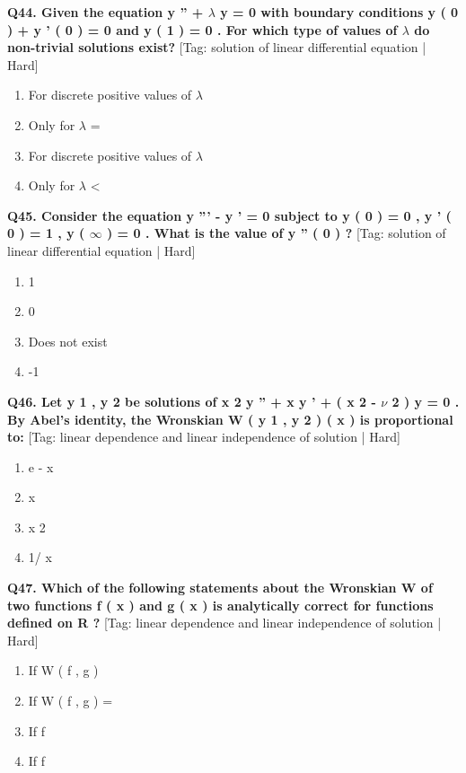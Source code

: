 \noindent\textbf{Q44. Given the equation y '' + $\lambda$ y = 0 with boundary conditions y ( 0 ) + y ' ( 0 ) = 0 and y ( 1 ) = 0 . For which type of values of $\lambda$ do non-trivial solutions exist?} \hfill [Tag: solution of linear differential equation | Hard]
\begin{enumerate}[label=(\alph*),topsep=2pt,itemsep=1pt,partopsep=0pt,parsep=0pt]
    \item {{For discrete positive values of $\lambda$}}
    \item {{Only for $\lambda$ =}}
    \item {{For discrete positive values of $\lambda$}}
    \item {{Only for $\lambda$ <}}
\end{enumerate}
\vspace{2mm}

\noindent\textbf{Q45. Consider the equation y ''' - y ' = 0 subject to y ( 0 ) = 0 , y ' ( 0 ) = 1 , y ( $\infty$ ) = 0 . What is the value of y '' ( 0 ) ?} \hfill [Tag: solution of linear differential equation | Hard]
\begin{enumerate}[label=(\alph*),topsep=2pt,itemsep=1pt,partopsep=0pt,parsep=0pt]
    \item {{1}}
    \item {{0}}
    \item {{Does not exist}}
    \item {{-1}}
\end{enumerate}
\vspace{2mm}

\noindent\textbf{Q46. Let y 1 , y 2 be solutions of x 2 y '' + x y ' + ( x 2 - $\nu$ 2 ) y = 0 . By Abel's identity, the Wronskian W ( y 1 , y 2 ) ( x ) is proportional to:} \hfill [Tag: linear dependence and linear independence of solution | Hard]
\begin{enumerate}[label=(\alph*),topsep=2pt,itemsep=1pt,partopsep=0pt,parsep=0pt]
    \item {{e - x}}
    \item {{x}}
    \item {{x 2}}
    \item {{1/ x}}
\end{enumerate}
\vspace{2mm}

\noindent\textbf{Q47. Which of the following statements about the Wronskian W of two functions f ( x ) and g ( x ) is analytically correct for functions defined on R ?} \hfill [Tag: linear dependence and linear independence of solution | Hard]
\begin{enumerate}[label=(\alph*),topsep=2pt,itemsep=1pt,partopsep=0pt,parsep=0pt]
    \item {{If W ( f , g ) }}
    \item {{If W ( f , g ) =}}
    \item {{If f}}
    \item {{If f}}
\end{enumerate}
\vspace{2mm}

